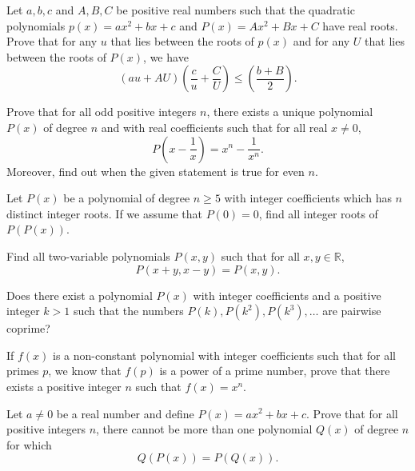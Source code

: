 \begin{question}[name={1994 Romania}]
    Let $a,b,c$ and $A,B,C$ be positive real numbers such that the quadratic polynomials $p(x)=ax^2+bx+c$ and $P(x)=Ax^2+Bx+C$ have real roots. Prove that for any $u$ that lies between the roots of $p(x)$ and for any $U$ that lies between the roots of $P(x)$, we have
    \[(au+AU)\left(\frac{c}{u}+\frac{C}{U}\right) \leq \left(\frac{b+B}{2}\right).\]
\end{question}

\begin{question}[name={1998 Vietnam}]
    Prove that for all odd positive integers $n$, there exists a unique polynomial $P(x)$ of degree $n$ and with real coefficients such that for all real $x\neq 0$,
    \[P\left(x-\frac{1}{x}\right) = x^n - \frac{1}{x^n}.\]
    Moreover, find out when the given statement is true for even $n$.
\end{question}

\begin{question}[name={1998 Czech And Slovak}]
    Let $P(x)$ be a polynomial of degree $n\geq 5$ with integer coefficients which has $n$ distinct integer roots. If we assume that $P(0)=0$, find all integer roots of $P(P(x))$.
\end{question}

\begin{question}[name={1998 Russia}]
    Find all two-variable polynomials $P(x,y)$ such that for all $x,y\in\mathbb R$,
    \[P(x+y,x-y)=P(x,y).\]
\end{question}



\begin{question}[name={1998 Russia}]
    Does there exist a polynomial $P(x)$ with integer coefficients and a positive integer $k>1$ such that the numbers $P(k), P(k^2), P(k^3),\dots$ are pairwise coprime?
\end{question}


\begin{question}
    If $f(x)$ is a non-constant polynomial with integer coefficients such that for all primes $p$, we know that $f(p)$ is a power of a prime number, prove that there exists a positive integer $n$ such that $f(x)=x^n$.
\end{question}

\begin{question}[name={1979 Hungary}]
    Let $a\neq 0$ be a real number and define $P(x)=ax^2+bx+c$. Prove that for all positive integers $n$, there cannot be more than one polynomial $Q(x)$ of degree $n$ for which
    \[Q(P(x))=P(Q(x)).\]
\end{question}


